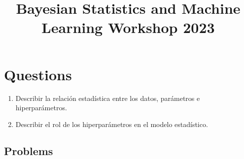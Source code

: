 \documentclass[12pt]{paper}
\title{\begin{center}Bayesian Statistics and Machine Learning Workshop 2023\end{center}}
\subtitle{\begin{center}\Large Parametric Priors and Hyperparameters\\ Martín Onetto \end{center}}
\begin{document}
\maketitle


\topmargin -2.0cm
\oddsidemargin -0.2cm
\evensidemargin -0.2cm

\vspace{-80pt}

\section{Questions}

\begin{enumerate}

\item Describir la relación estadística entre los datos, parámetros e hiperparámetros.
\item Describir el rol de los hiperparámetros en el modelo estadístico.
\end{enumerate}

\subsection{Problems}
\end{document}
